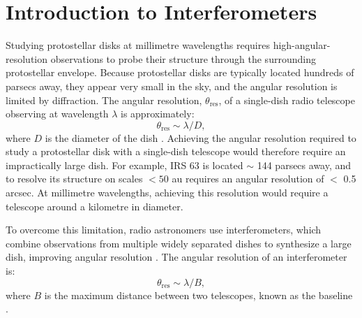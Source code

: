 



\section{Introduction to Interferometers}

Studying protostellar disks at millimetre wavelengths requires high-angular-resolution observations to probe their structure through the surrounding protostellar envelope. Because protostellar disks are typically located hundreds of parsecs away, they appear very small in the sky, and the angular resolution is limited by diffraction. The angular resolution, $\theta_{\text{res}}$, of a single-dish radio telescope observing at wavelength $\lambda$ is approximately:
\begin{equation}
    \theta_{\text{res}}\sim \lambda/D,
\end{equation}
\noindent where $D$ is the diameter of the dish \citep{Monnier}. Achieving the angular resolution required to study a protostellar disk with a single-dish telescope would therefore require an impractically large dish. For example, IRS 63 is located $\sim$ 144 parsecs away, and to resolve its structure on scales $< 50$ au requires an angular resolution of $<$ 0.5 arcsec. At millimetre wavelengths, achieving this resolution would require a telescope around a kilometre in diameter. 


To overcome this limitation, radio astronomers use interferometers, which combine observations from multiple widely separated dishes to synthesize a large dish, improving angular resolution  \citep{Ludovici2026}. The angular resolution of an interferometer is:
\begin{equation}
    \theta_{\text{res}}\sim \lambda/B, 
\end{equation}
\noindent where $B$ is the maximum distance between two telescopes, known as the baseline \citep{Monnier}. 














